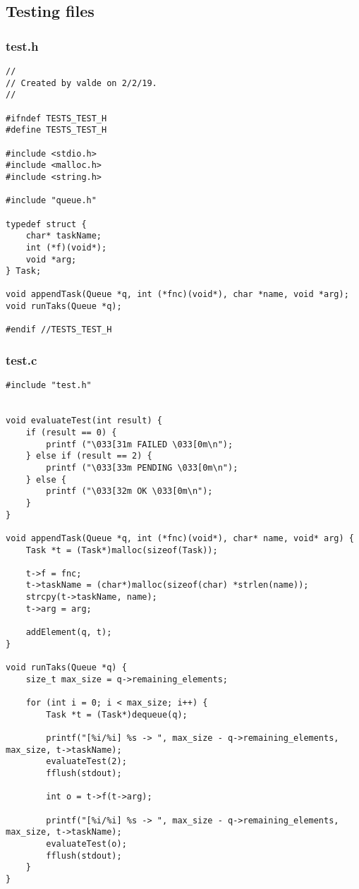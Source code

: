 \documentclass[a4paper]{article}
\begin{document}
\subsection{Testing files}

\subsubsection{test.h}
\begin{verbatim}
//
// Created by valde on 2/2/19.
//

#ifndef TESTS_TEST_H
#define TESTS_TEST_H

#include <stdio.h>
#include <malloc.h>
#include <string.h>

#include "queue.h"

typedef struct {
    char* taskName;
    int (*f)(void*);
    void *arg;
} Task;

void appendTask(Queue *q, int (*fnc)(void*), char *name, void *arg);
void runTaks(Queue *q);

#endif //TESTS_TEST_H
\end{verbatim}

\subsubsection{test.c}
\begin{verbatim}
#include "test.h"


void evaluateTest(int result) {
    if (result == 0) {
        printf ("\033[31m FAILED \033[0m\n");
    } else if (result == 2) {
        printf ("\033[33m PENDING \033[0m\n");
    } else {
        printf ("\033[32m OK \033[0m\n");
    }
}

void appendTask(Queue *q, int (*fnc)(void*), char* name, void* arg) {
    Task *t = (Task*)malloc(sizeof(Task));

    t->f = fnc;
    t->taskName = (char*)malloc(sizeof(char) *strlen(name));
    strcpy(t->taskName, name);
    t->arg = arg;

    addElement(q, t);
}

void runTaks(Queue *q) {
    size_t max_size = q->remaining_elements;

    for (int i = 0; i < max_size; i++) {
        Task *t = (Task*)dequeue(q);

        printf("[%i/%i] %s -> ", max_size - q->remaining_elements, max_size, t->taskName);
        evaluateTest(2);
        fflush(stdout);

        int o = t->f(t->arg);

        printf("[%i/%i] %s -> ", max_size - q->remaining_elements, max_size, t->taskName);
        evaluateTest(o);
        fflush(stdout);
    }
}
\end{verbatim}
\end{document}
